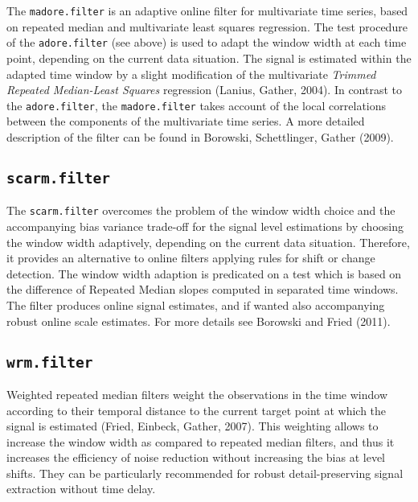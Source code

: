 \documentclass[a4paper]{scrartcl}
\begin{document}
The \texttt{madore.filter} is an adaptive online filter for multivariate time series, based on repeated median and multivariate least squares regression. The test procedure of the \texttt{adore.filter} (see above) is used to adapt the window width at each time point, depending on the current data situation. The signal is estimated within the adapted time window by a slight modification of the multivariate \textit{Trimmed Repeated Median-Least Squares} regression (Lanius, Gather, 2004). In contrast to the \texttt{adore.filter}, the \texttt{madore.filter} takes account of the local correlations between the components of the multivariate time series. A more detailed description of the filter can be found in Borowski, Schettlinger, Gather (2009).

\subsection{\texttt{scarm.filter}}

The \texttt{scarm.filter} overcomes the problem of the window width choice and the accompanying bias variance trade-off for the signal level estimations by choosing the window width adaptively, depending on the current data situation. Therefore, it provides an alternative to online filters applying rules for shift or change detection. The window width adaption is predicated on a test which is based on the difference of Repeated Median slopes computed in separated time windows. The filter produces online signal estimates, and if wanted also accompanying robust online scale estimates. For more details see Borowski and Fried (2011).

\subsection{\texttt{wrm.filter}}

Weighted repeated median filters weight the observations in the
time window according to their temporal distance to the current
target point at which the signal is estimated (Fried, Einbeck,
Gather, 2007). This weighting allows to increase the window width as compared to
repeated median filters, and thus it increases the
efficiency of noise reduction without increasing the bias at level
shifts. They can be particularly recommended for robust
detail-preserving signal extraction without time delay.
\end{document}
